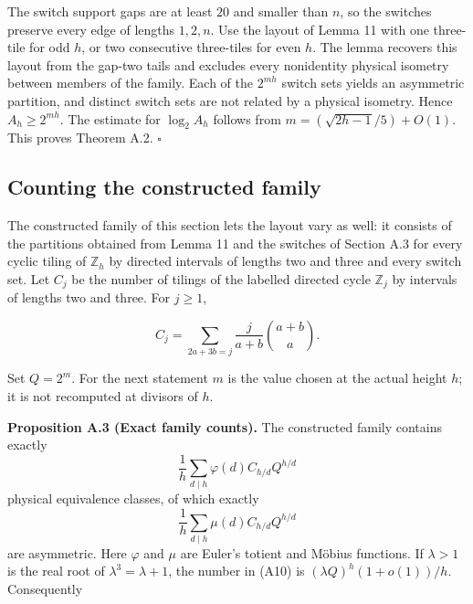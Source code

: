 \documentclass[11pt,a4paper]{article}
\newcommand{\statementstart}{\par\addvspace{6pt plus 1pt minus 1pt}\noindent}
\begin{document}
The switch support gaps are at least \(20\) and smaller than \(n\), so the switches preserve every edge of lengths \(1,2,n\). Use the layout of Lemma 11 with one three-tile for odd \(h\), or two consecutive three-tiles for even \(h\). The lemma recovers this layout from the gap-two tails and excludes every nonidentity physical isometry between members of the family. Each of the \(2^{mh}\) switch sets yields an asymmetric partition, and distinct switch sets are not related by a physical isometry. Hence \(A_h\geq2^{mh}\). The estimate for \(\log_2 A_h\) follows from \(m=(\sqrt{2h-1}/5)+O(1)\). This proves Theorem A.2. \(\square\)

\hypertarget{counting-the-constructed-family}{%
\subsection{Counting the constructed family}\label{counting-the-constructed-family}}

The constructed family of this section lets the layout vary as well: it consists of the partitions obtained from Lemma 11 and the switches of Section A.3 for every cyclic tiling of \(\mathbb Z_h\) by directed intervals of lengths two and three and every switch set. Let \(C_j\) be the number of tilings of the labelled directed cycle \(\mathbb Z_j\) by intervals of lengths two and three. For \(j\geq1\),

\begin{equation}
C_j=\sum_{2a+3b=j}\frac{j}{a+b}\binom{a+b}{a}.
\tag{A8}\label{eq:A8}
\end{equation}

Set \(Q=2^m\). For the next statement \(m\) is the value chosen at the actual height \(h\); it is not recomputed at divisors of \(h\).

\statementstart\textbf{Proposition A.3 (Exact family counts).} The constructed family contains exactly \begin{equation}
\frac1h\sum_{d\mid h}\varphi(d)C_{h/d}Q^{h/d}
\tag{A9}\label{eq:A9}
\end{equation} physical equivalence classes, of which exactly \begin{equation}
\frac1h\sum_{d\mid h}\mu(d)C_{h/d}Q^{h/d}
\tag{A10}\label{eq:A10}
\end{equation} are asymmetric. Here \(\varphi\) and \(\mu\) are Euler's totient and Möbius functions. If \(\lambda>1\) is the real root of \(\lambda^3=\lambda+1\), the number in (A10) is \((\lambda Q)^h(1+o(1))/h\). Consequently
\end{document}
